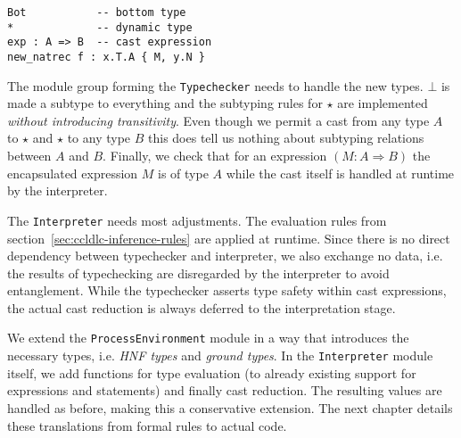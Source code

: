 \begin{lstlisting}[float,language=ldgv,
  caption=New language constructs for CCLDLC,
  label=lst:ccldlc-grammar]
Bot           -- bottom type
*             -- dynamic type
exp : A => B  -- cast expression
new_natrec f : x.T.A { M, y.N }
\end{lstlisting}

The module group forming the \texttt{Typechecker} needs to handle the new types. $\bot$ is made a subtype to everything and the subtyping rules for $\star$ are implemented \emph{without introducing transitivity}. Even though we permit a cast from any type $A$ to $\star$ and $\star$ to any type $B$ this does tell us nothing about subtyping relations between $A$ and $B$. Finally, we check that for an expression $(M : A \Rightarrow B)$ the encapsulated expression $M$ is of type $A$ while the cast itself is handled at runtime by the interpreter.

The \texttt{Interpreter} needs most adjustments. The evaluation rules from section~\ref{sec:ccldlc-inference-rules} are applied at runtime. Since there is no direct dependency between typechecker and interpreter, we also exchange no data, i.e. the results of typechecking are disregarded by the interpreter to avoid entanglement. While the typechecker asserts type safety within cast expressions, the actual cast reduction is always deferred to the interpretation stage.

We extend the \texttt{ProcessEnvironment} module in a way that introduces the necessary types, i.e. \emph{HNF types} and \emph{ground types}. In the \texttt{Interpreter} module itself, we add functions for type evaluation (to already existing support for expressions and statements) and finally cast reduction. The resulting values are handled as before, making this a conservative extension. The next chapter details these translations from formal rules to actual code.
